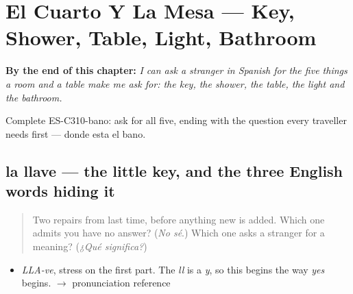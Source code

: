 
\chapter{El Cuarto Y La Mesa --- Key, Shower, Table, Light, Bathroom}
\label{ch:el-cuarto-y-la-mesa}

\begin{chapteropening}
\textbf{By the end of this chapter:} \emph{I can ask a stranger in Spanish for the five things a room and a table make me ask for: the key, the shower, the table, the light and the bathroom.}

Complete ES-C310-bano: ask for all five, ending with the question every traveller needs first --- donde esta el bano.
\end{chapteropening}

\section[la llave]{la llave — the little key, and the three English words hiding it}

\label{lesson:ES-C310-llave}



\begin{quote}
Two repairs from last time, before anything new is added. Which one admits you have no answer? (\emph{No sé}.) Which one asks a stranger for a meaning? (\emph{¿Qué significa?})
\end{quote}

\begin{sounds}
\begin{itemize}
\raggedright
  \item \emph{LLA-ve}, stress on the first part. The \emph{ll} is a \emph{y}, so this begins the way \emph{yes} begins. $\to$ pronunciation reference
\end{itemize}
\end{sounds}

